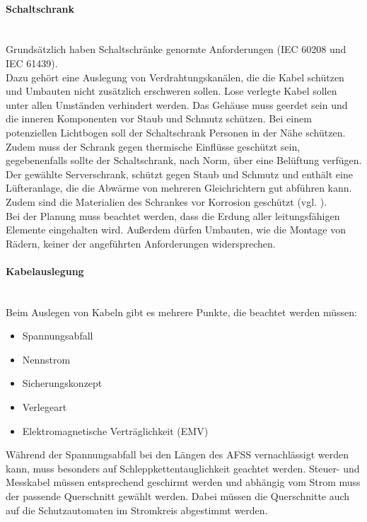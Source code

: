     \paragraph{Schaltschrank}\mbox{}\\
    Grundsätzlich haben Schaltschränke genormte Anforderungen (IEC 60208 und IEC 61439).\\
    Dazu gehört eine Auslegung von Verdrahtungskanälen, die die Kabel schützen und Umbauten nicht zusätzlich erschweren sollen. Lose verlegte Kabel sollen unter allen Umständen verhindert werden. Das Gehäuse muss geerdet sein und die inneren Komponenten vor Staub und Schmutz schützen. Bei einem potenziellen Lichtbogen soll der Schaltschrank Personen in der Nähe schützen. Zudem muss der Schrank gegen thermische Einflüsse geschützt sein, gegebenenfalls sollte der Schaltschrank, nach Norm, über eine Belüftung verfügen.\\
    Der gewählte Serverschrank, schützt gegen Staub und Schmutz und enthält eine Lüfteranlage, die die Abwärme von mehreren Gleichrichtern gut abführen kann. Zudem sind die Materialien des Schrankes vor Korrosion geschützt (vgl. \cite{Schaltschrank-Anforderungen}).\\
    Bei der Planung muss beachtet werden, dass die Erdung aller leitungsfähigen Elemente eingehalten wird. Außerdem dürfen Umbauten, wie die Montage von Rädern, keiner der angeführten Anforderungen widersprechen.

    \paragraph{Kabelauslegung}\mbox{}\\
    Beim Auslegen von Kabeln gibt es mehrere Punkte, die beachtet werden müssen:
    \begin{itemize}
        \item Spannungsabfall
        \item Nennstrom
        \item Sicherungskonzept
        \item Verlegeart
        \item Elektromagnetische Verträglichkeit (EMV)
    \end{itemize} 
    Während der Spannungsabfall bei den Längen des AFSS vernachlässigt werden kann, muss besonders auf Schleppkettentauglichkeit geachtet werden. Steuer- und Messkabel müssen entsprechend geschirmt werden und abhängig vom Strom muss der passende Querschnitt gewählt werden. Dabei müssen die Querschnitte auch auf die Schutzautomaten im Stromkreis abgestimmt werden.\\

